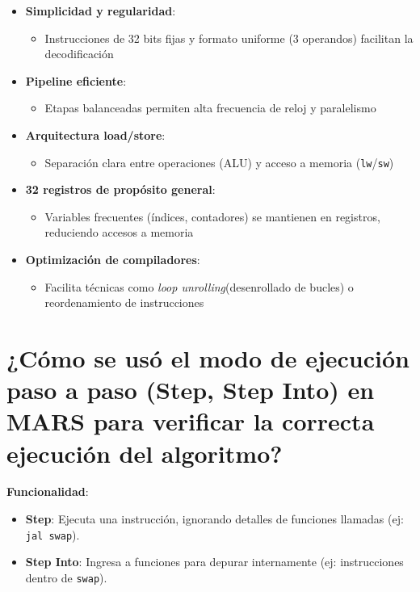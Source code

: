 \documentclass{article}
\begin{document}
\begin{itemize}
\begin{itemize}[label=--]
\begin{itemize}
  \item \textbf{Simplicidad y regularidad}:
    \begin{itemize}
      \item Instrucciones de 32 bits fijas y formato uniforme (3 operandos) facilitan la decodificación
    \end{itemize}
  \item \textbf{Pipeline eficiente}:
    \begin{itemize}
      \item Etapas balanceadas permiten alta frecuencia de reloj y paralelismo
    \end{itemize}
  \item \textbf{Arquitectura load/store}:
    \begin{itemize}
      \item Separación clara entre operaciones (ALU) y acceso a memoria (\texttt{lw}/\texttt{sw})
    \end{itemize}
  \item \textbf{32 registros de propósito general}:
    \begin{itemize}
      \item Variables frecuentes (índices, contadores) se mantienen en registros, reduciendo accesos a memoria
    \end{itemize}
  \item \textbf{Optimización de compiladores}:
    \begin{itemize}
      \item Facilita técnicas como \textit{loop unrolling}(desenrollado de bucles) o reordenamiento de instrucciones
    \end{itemize}
\end{itemize}

\section{ ¿Cómo se usó el modo de ejecución paso a paso (Step, Step Into) en MARS para verificar 
la correcta ejecución del algoritmo? }

\textbf{Funcionalidad}:
\begin{itemize}
  \item \textbf{Step}: Ejecuta una instrucción, ignorando detalles de funciones llamadas (ej: \texttt{jal swap}).
  \item \textbf{Step Into}: Ingresa a funciones para depurar internamente (ej: instrucciones dentro de \texttt{swap}).
\end{itemize}


\end{itemize}
\end{itemize}
\end{document}
